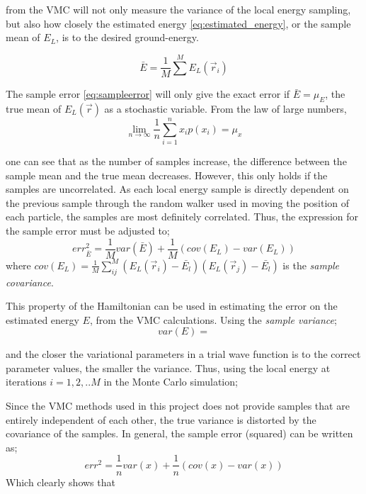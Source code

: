 \documentclass[%
oneside,                 %
final,                   %
10pt]{article}
\begin{document}
from the VMC will not only measure the variance of the local energy sampling, but also how closely the estimated energy \eqref{eq:estimated_energy}, or the sample mean of $E_L$, is to the desired ground-energy.

\begin{equation}
\bar{E}=\frac{1}{M}\sum^M E_L(\vec r_i)
\label{eq:estimated_energy}
\end{equation}

The sample error \eqref{eq:sampleerror} will only give the exact error if $\bar{E}=\mu_E$, the true mean of $E_L(\vec r)$ as a stochastic variable. From the law of large numbers,
\begin{equation*}
\lim_{n\rightarrow \infty} \frac{1}{n} \sum^n_{i=1} x_i p(x_i)= \mu_x
\end{equation*} 

one can see that as the number of samples increase, the difference between the sample mean and the true mean decreases. However, this only holds if the samples are uncorrelated. As each local energy sample is directly dependent on the previous sample through the random walker used in moving the position of each particle, the samples are most definitely correlated. Thus, the expression for the sample error must be adjusted to;
\begin{equation}
err_{\bar E }^2=\frac{1}{M} var( \bar E) + \frac{1}{M} \left(cov(E_L)-var(E_L)\right)
\end{equation}
where $cov(E_L)=\frac{1}{M}\sum_{ij}^M \left(E_L(\vec r_i)-\bar{E_l}\right) \left(E_L(\vec r_j)-\bar{E_l}\right)$ is the \textit{sample covariance}.
 


This property of the Hamiltonian can be used in estimating the error on the estimated energy $E$, from the VMC calculations. Using the \textit{sample variance};
\begin{equation}
var(E)=
\end{equation}


and the closer the variational parameters in a trial wave function is to the correct parameter values, the smaller the variance. Thus, using the local energy at iterations $i=1,2,..M$ in the Monte Carlo simulation;

Since the VMC methods used in this project does not provide samples that are entirely independent of each other, the true variance is distorted by the covariance of the samples. In general, the sample error (squared) can be written as;
\begin{equation}
err^2 = \frac{1}{n} var(x) + \frac{1}{n} \left( cov(x)-var(x) \right) 
\end{equation}
Which clearly shows that 
\end{document}
